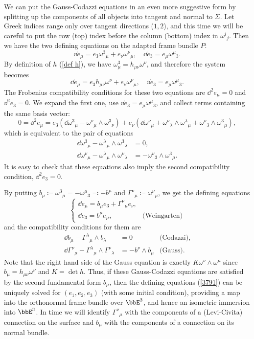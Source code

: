 \begin{rem}
    We can put the Gauss-Codazzi equations in an even more suggestive form by splitting up the components of all objects into tangent and normal to $\Sigma$. Let Greek indices range only over tangent directions ($1,2$), and this time we will be careful to put the row (top) index before the column (bottom) index in $\omega^i{}_j$. Then we have the two defining equations on the adapted frame bundle $P$:
    \[\dd e_\mu=e_3\omega^3{}_\mu + e_\nu\omega^\nu{}_\mu,\quad \dd e_3=e_\mu\omega^\mu{}_3.\]
    By definition of $h$ (\ref{def h}), we have $\omega^3_\mu=h_{\mu\nu}\omega^\nu$, and therefore the system becomes 
    \[\dd e_\mu= e_3 h_{\mu\nu}\omega^\nu+ e_\nu\omega^\nu{}_\mu ,\quad \dd e_3=e_\mu\omega^\mu{}_3.\]
    The Frobenius compatibility conditions for these two equations are $\dd^2 e_\mu=0$ and $\dd^2 e_3=0$. We expand the first one, use $\dd e_3=e_\mu\omega^\mu{}_3$, and collect terms containing the same basis vector:
    \[0=\dd^2e_\mu=e_3\left(\dd \omega^3{}_\mu-\omega^\nu{}_\mu\wedge\omega^3{}_\nu\right)
    +e_\nu\left(\dd\omega^\nu{}_\mu+\omega^\nu{}_\lambda\wedge\omega^\lambda{}_\mu+\omega^\nu{}_3\wedge\omega^3{}_\mu\right),
    \]
    which is equivalent to the pair of equations 
    \begin{align}
        \dd\omega^3{}_\mu-\omega^\lambda{}_\mu\wedge\omega^3{}_\lambda&=0,\\
        \dd\omega^\nu{}_\mu-\omega^\lambda{}_\mu\wedge\omega^\nu{}_\lambda&=-\omega^\nu{}_3\wedge \omega^3{}_\mu.
    \end{align}
    It is easy to check that these equations also imply the second compatibility condition, $\dd^2 e_3=0$. 
    
    By putting $b_\mu\coloneqq \omega^3{}_\mu=-\omega^\mu{}_3\eqqcolon-b^\mu$ and $\Gamma^\nu{}_\mu\coloneqq \omega^\nu{}_\mu$, we get the defining equations
    \[\begin{cases}
        \dd e_\mu=b_\mu e_3+\Gamma^\nu{}_\mu e_\nu, &\\
        \dd e_3=b^\mu e_\mu, &\text{(Weingarten)}
    \end{cases}\label{3791}\]
    and the compatibility conditions for them are
    \begin{align}
        \dd b_\mu-\Gamma^\lambda{}_\mu \wedge b_\lambda&=0 &\text{(Codazzi),}\\
        \dd \Gamma^\nu{}_\mu-\Gamma^\lambda{}_\mu\wedge\Gamma^\nu{}_\lambda&=-b^\nu\wedge b_\mu &\text{(Gauss).}
    \end{align}
    Note that the right hand side of the Gauss equation is exactly $K \omega^\nu\wedge\omega^\mu$ since $b_\mu=h_{\mu\nu}\omega^\nu$ and $K=\det h$. Thus, if these Gauss-Codazzi equations are satisfied by the second fundamental form $b_\mu$, then the defining equations (\ref{3791}) can be uniquely solved for $(e_1,e_2,e_3)$ (with some initial condition), providing a map into the orthonormal frame bundle over $\bbE^3$, and hence an isometric immersion into $\bbE^3$. In time we will identify $\Gamma^\nu{}_\mu$ with the components of a (Levi-Civita) connection on the surface and $b_\mu$ with the components of a connection on its normal bundle.
\end{rem}




